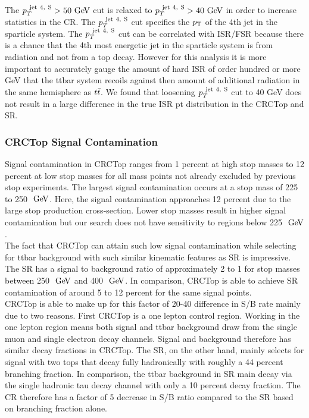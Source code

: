 \indent The $\pTjV>50\gev$ cut is relaxed to $\pTjV>40\gev$ in order to increase statistics in the CR.  The $p_{T}^{~\mathrm{jet~4,~S}}$ cut specifies the $p_{\mathrm{T}}$ of the 4th jet in the sparticle system.  The $p_{T}^{~\mathrm{jet~4,~S}}$ cut can be correlated with ISR/FSR because there is a chance that the 4th most energetic jet in the sparticle system is from radiation and not from a top decay.  However for this analysis it is more important to accurately gauge the amount of hard ISR of order hundred or more GeV that the ttbar system recoils against then amount of additional radiation in the same hemisphere as $t\bar{t}$. We found that loosening $p_{T}^{~\mathrm{jet~4,~S}}$ cut to 40 GeV does not result in a large difference in the true ISR pt distribution in the CRCTop and SR. \\

\subsubsection*{CRCTop Signal Contamination}

\indent Signal contamination in CRCTop ranges from 1 percent at high stop masses to 12 percent at low stop masses for all mass points not already excluded by previous stop experiments.  The largest signal contamination occurs at a stop mass of 225 to 250 $\gev$.   Here, the signal contamination approaches 12 percent due to the large stop production cross-section.  Lower stop masses result in higher signal contamination but our search does not have sensitivity to regions below 225 $\gev$.  \\

\indent The fact that CRCTop can attain such low signal contamination while selecting for ttbar background with such similar kinematic features as SR is impressive.  The SR has a signal to background ratio of approximately 2 to 1 for stop masses between 250 $\gev$ and 400 $\gev$.   In comparison, CRCTop is able to achieve SR contamination of around 5 to 12 percent for the same signal points.  \\

\indent CRCTop is able to make up for this factor of 20-40 difference in S/B rate mainly due to two reasons.  First CRCTop is a one lepton control region.  Working in the one lepton region means both signal and ttbar background draw from the single muon and single electron decay channels.  Signal and background therefore has similar decay fractions in CRCTop. The SR, on the other hand, mainly selects for signal with two tops that decay fully hadronically with roughly a 44 percent branching fraction.  In comparison, the ttbar background in SR main decay via the single hadronic tau decay channel with only a 10 percent decay fraction.  The CR therefore has a factor of 5 decrease in S/B ratio compared to the SR based on branching fraction alone.  \\

